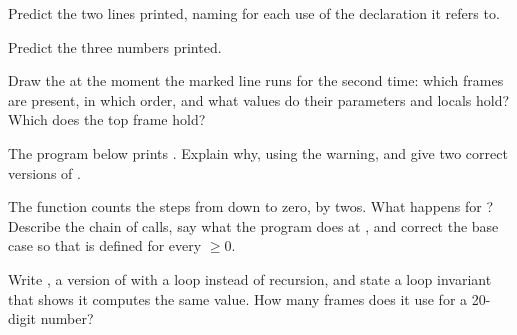 \begin{exercise}[$\star$]\label{exo:b1:c-functions-and-stack:2}
Predict the two lines printed, naming for each use of  the declaration it refers to.
\end{exercise}

\begin{exercise}[$\star$]\label{exo:b1:c-functions-and-stack:3}
Predict the three numbers printed.
\end{exercise}

\begin{exercise}[$\star$]\label{exo:b1:c-functions-and-stack:4}
Draw the  at the moment the marked line runs for the second time: which frames are present, in which
order, and what values do their parameters and locals hold? Which  does the top frame hold?
\end{exercise}

\begin{exercise}[$\star\star$]\label{exo:b1:c-functions-and-stack:5}
The program below prints . Explain why, using the warning, and give two correct versions of
.
\end{exercise}

\begin{exercise}[$\star\star$]\label{exo:b1:c-functions-and-stack:6}
The function  counts the steps from  down to zero, by twos. What happens for ?
Describe the chain of calls, say what the program does at , and correct the base case so that
 is defined for every  $\geq 0$.
\end{exercise}

\begin{exercise}[$\star\star$]\label{exo:b1:c-functions-and-stack:7}
Write , a version of  with a loop instead of
recursion, and state a loop invariant that shows it computes the same value. How many frames does it use for a
20-digit number?
\end{exercise}

